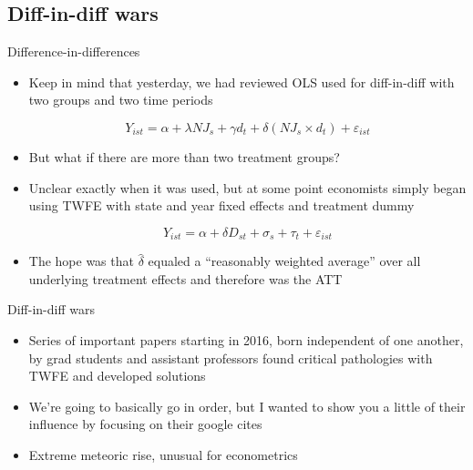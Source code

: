 \documentclass{beamer}
\begin{document}
\subsection{Diff-in-diff wars}

\begin{frame}{Difference-in-differences}

\begin{itemize}
\item Keep in mind that yesterday, we had reviewed OLS used for diff-in-diff with two groups and two time periods

$$Y_{ist} = \alpha + \lambda NJ_s + \gamma d_t + \delta (NJ_s \times d_t) + \varepsilon_{ist}$$

\item But what if there are more than two treatment groups?
\item Unclear exactly when it was used, but at some point economists simply began using TWFE with state and year fixed effects and treatment dummy

$$ Y_{ist} = \alpha + \delta D_{st} + \sigma_s + \tau_t + \varepsilon_{ist}$$

\item The hope was that $\widehat{\delta}$ equaled a ``reasonably weighted average'' over all underlying treatment effects and therefore was the ATT
\end{itemize}

\end{frame}

\begin{frame}{Diff-in-diff wars}

\begin{itemize}
\item Series of important papers starting in 2016, born independent of one another, by grad students and assistant professors found critical pathologies with TWFE and developed solutions
\item We're going to basically go in order, but I wanted to show you a little of their influence by focusing on their google cites
\item Extreme meteoric rise, unusual for econometrics
\end{itemize}

\end{frame}




\end{document}
